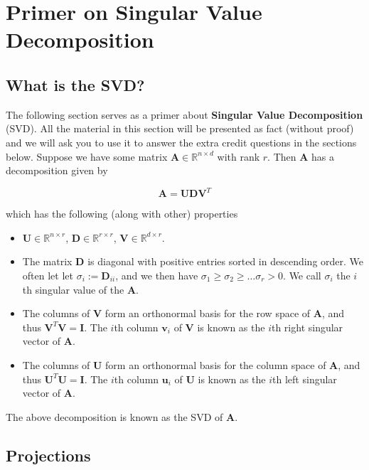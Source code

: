 \section{Primer on Singular Value Decomposition}
\subsection{What is the SVD?}

The following section serves as a primer about \textbf{Singular Value Decomposition} (SVD). All the material in this section will be presented as fact (without proof) and we will ask you to use it to answer the extra credit questions in the sections below. Suppose we have some matrix $\textbf{A} \in \mathbb{R}^{n \times d}$ with rank $r$. Then $\textbf{A}$ has a decomposition given by

\begin{equation}
\textbf{A} = \textbf{U} \textbf{D}\textbf{V}^{T}
\label{svd_decomp}
\end{equation}

which has the following (along with other) properties

\begin{itemize}
    \item $\textbf{U} \in \mathbb{R}^{n \times r}$, $\textbf{D} \in \mathbb{R}^{r \times r}$, $\textbf{V} \in \mathbb{R}^{d \times r}.$
    \item The matrix $\textbf{D}$ is diagonal with positive entries sorted in descending order. We often let let $\sigma_{i} := \textbf{D}_{ii}$, and we then have $\sigma_{1} \geq \sigma_{2} \geq \dots \sigma_{r} > 0$. We call $\sigma_{i}$ the $i$th singular value of the $\textbf{A}$.  
    \item The columns of $\textbf{V}$ form an orthonormal basis for the row space of $\textbf{A}$, and thus $\textbf{V}^{T}\textbf{V} = \textbf{I}$. The $i$th column $\textbf{v}_{i}$ of $\textbf{V}$ is known as the $i$th right singular vector of $\textbf{A}$.
    \item The columns of $\textbf{U}$ form an orthonormal basis for the column space of $\textbf{A}$, and thus $\textbf{U}^{T}\textbf{U} = \textbf{I}$. The $i$th column $\textbf{u}_{i}$ of $\textbf{U}$ is known as the $i$th left singular vector of $\textbf{A}$.
\end{itemize}

The above decomposition is known as the SVD of $\textbf{A}$. 

\subsection{Projections}

